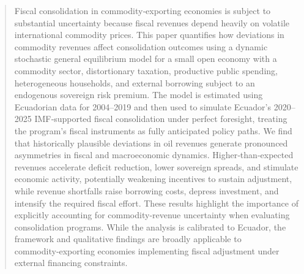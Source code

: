 \documentclass[12pt]{article}
\begin{document}
\begin{abstract}
\singlespacing
Fiscal consolidation in commodity‑exporting economies is subject to substantial uncertainty because fiscal revenues depend heavily on volatile international commodity prices. This paper quantifies how deviations in commodity revenues affect consolidation outcomes using a dynamic stochastic general equilibrium model for a small open economy with a commodity sector, distortionary taxation, productive public spending, heterogeneous households, and external borrowing subject to an endogenous sovereign risk premium. The model is estimated using Ecuadorian data for 2004–2019 and then used to simulate Ecuador’s 2020–2025 IMF‑supported fiscal consolidation under perfect foresight, treating the program’s fiscal instruments as fully anticipated policy paths. We find that historically plausible deviations in oil revenues generate pronounced asymmetries in fiscal and macroeconomic dynamics. Higher‑than‑expected revenues accelerate deficit reduction, lower sovereign spreads, and stimulate economic activity, potentially weakening incentives to sustain adjustment, while revenue shortfalls raise borrowing costs, depress investment, and intensify the required fiscal effort. These results highlight the importance of explicitly accounting for commodity‑revenue uncertainty when evaluating consolidation programs. While the analysis is calibrated to Ecuador, the framework and qualitative findings are broadly applicable to commodity‑exporting economies implementing fiscal adjustment under external financing constraints.


\end{abstract}
\end{document}

